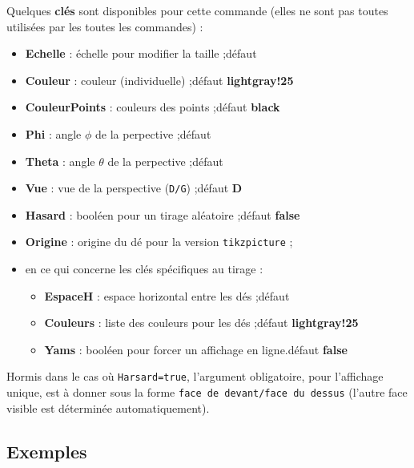 \documentclass[french,a4paper,11pt]{article}
\newcommand\Cle[1]{{\bfseries\sffamily\textlangle #1\textrangle}}
\begin{document}
\begin{tipblock}
Quelques \Cle{clés} sont disponibles pour cette commande (elles ne sont pas toutes utilisées par les toutes les commandes) :

\begin{itemize}
	\item \Cle{Echelle} : échelle pour modifier la taille ;\hfill{}défaut \Cle{1}
	\item \Cle{Couleur} : couleur (individuelle) ;\hfill{}défaut \Cle{lightgray!25}
	\item \Cle{CouleurPoints} : couleurs des points ;\hfill{}défaut \Cle{black}
	\item \Cle{Phi} : angle $\phi$ de la perpective ;\hfill{}défaut \Cle{110}
	\item \Cle{Theta} : angle $\theta$ de la perpective ;\hfill{}défaut \Cle{70}
	\item \Cle{Vue} : vue de la perspective (\texttt{D/G}) ;\hfill{}défaut \Cle{D}
	\item \Cle{Hasard} : booléen pour un tirage aléatoire ;\hfill{}défaut \Cle{false}
	\item \Cle{Origine} : origine du dé pour la version \texttt{tikzpicture} ;
	\item en ce qui concerne les clés spécifiques au tirage :
	\begin{itemize}
		\item \Cle{EspaceH} : espace horizontal entre les dés ;\hfill{}défaut \Cle{0mm}
		\item \Cle{Couleurs} : liste des couleurs pour les dés ;\hfill{}défaut \Cle{lightgray!25}
		\item \Cle{Yams} : booléen pour forcer un affichage en ligne.\hfill{}défaut \Cle{false}
	\end{itemize}
\end{itemize}

Hormis dans le cas où \texttt{Harsard=true}, l'argument obligatoire, pour l'affichage unique, est à donner sous la forme \texttt{face de devant/face du dessus} (l'autre face visible est déterminée automatiquement).
\end{tipblock}

\subsection{Exemples}

\begin{PresCode}{}

\end{PresCode}
\end{document}
